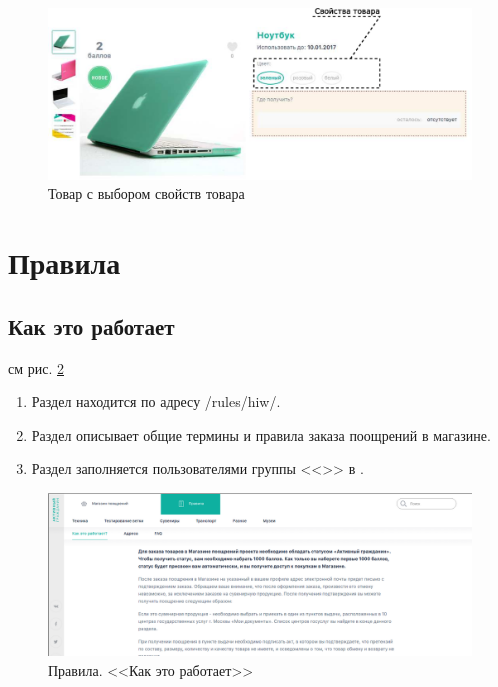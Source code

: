         \begin{figure}
            \includegraphics[width=170mm]{02_noauth_funcs/figures/08.eps}
            \caption{Товар с выбором свойств товара}
            \label{fig:goods_cart_props}
        \end{figure} 
        
    \section{Правила}
        \subsection{Как это работает}
            \label{sec:rules_hiw}
            
            см рис. \ref{fig:page_hiw}
            
            \begin{enumerate}
                \item Раздел находится по адресу /rules/hiw/.
                \item Раздел описывает общие термины и правила заказа 
                поощрений в магазине.
                \item Раздел заполняется пользователями группы 
                <<>> в .
            \end{enumerate}

        \begin{figure}
            \includegraphics[width=170mm]{02_noauth_funcs/figures/09.eps}
            \caption{Правила. <<Как это работает>>}
            \label{fig:page_hiw}
        \end{figure} 
            
